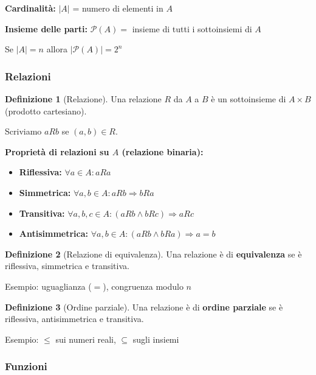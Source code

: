 \documentclass[a4paper, 11pt]{article}
\theoremstyle{definition}
\newtheorem{definizione}{Definizione}[section]
\theoremstyle{remark}
\theoremstyle{remark}
\newenvironment{nota}{%
	\begin{tcolorbox}[
		colback=codebg,
		colframe=primary,
		fonttitle=\bfseries,
		title=Nota,
		left=6pt, right=6pt, top=4pt, bottom=4pt
		]
	}{%
	\end{tcolorbox}
}
\begin{document}
	\begin{nota}
		\textbf{Cardinalità:} $|A|$ = numero di elementi in $A$
		
		\textbf{Insieme delle parti:} $\mathcal{P}(A) = $ insieme di tutti i sottoinsiemi di $A$
		
		Se $|A| = n$ allora $|\mathcal{P}(A)| = 2^n$
	\end{nota}
	
	\subsubsection{Relazioni}
	
	\begin{definizione}[Relazione]
		Una relazione $R$ da $A$ a $B$ è un sottoinsieme di $A \times B$ (prodotto cartesiano).
		
		Scriviamo $aRb$ se $(a,b) \in R$.
	\end{definizione}
	
	\textbf{Proprietà di relazioni su $A$ (relazione binaria):}
	\begin{itemize}
		\item \textbf{Riflessiva:} $\forall a \in A: aRa$
		\item \textbf{Simmetrica:} $\forall a,b \in A: aRb \Rightarrow bRa$
		\item \textbf{Transitiva:} $\forall a,b,c \in A: (aRb \land bRc) \Rightarrow aRc$
		\item \textbf{Antisimmetrica:} $\forall a,b \in A: (aRb \land bRa) \Rightarrow a = b$
	\end{itemize}
	
	\begin{definizione}[Relazione di equivalenza]
		Una relazione è di \textbf{equivalenza} se è riflessiva, simmetrica e transitiva.
		
		Esempio: uguaglianza ($=$), congruenza modulo $n$
	\end{definizione}
	
	\begin{definizione}[Ordine parziale]
		Una relazione è di \textbf{ordine parziale} se è riflessiva, antisimmetrica e transitiva.
		
		Esempio: $\leq$ sui numeri reali, $\subseteq$ sugli insiemi
	\end{definizione}
	
	\subsubsection{Funzioni}
	
\end{document}
